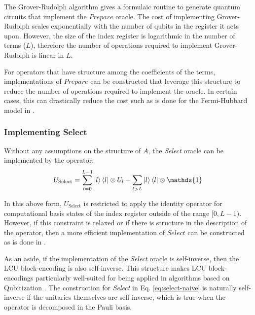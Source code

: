 The Grover-Rudolph algorithm \cite{grover2002creating} gives a formulaic routine to generate quantum circuits that implement the $\textit{Prepare}$ oracle.
The cost of implementing Grover-Rudolph scales exponentially with the number of qubits in the register it acts upon.
However, the size of the index register is logarithmic in the number of terms ($L$), therefore the number of operations required to implement Grover-Rudolph is linear in $L$.

For operators that have structure among the coefficients of the terms, implementations of $\textit{Prepare}$ can be constructed that leverage this structure to reduce the number of operations required to implement the oracle.
In certain cases, this can drastically reduce the cost such as is done for the Fermi-Hubbard model in \cite{babbush2018encoding}.

\subsubsection{Implementing \textbf{Select}}


Without any assumptions on the structure of $A$, the \textit{Select} oracle can be implemented by the operator:
\begin{equation}
    \label{eq:select-naive}
    U_\text{Select} = \sum_{l=0}^{L-1} \ket{l}\bra{l} \otimes U_l + \sum_{l>L} \ket{l}\bra{l} \otimes \mathds{1}
\end{equation}

In this above form, $U_\text{Select}$ is restricted to apply the identity operator for computational basis states of the index register outside of the range $[0, L-1)$.
However, if this constraint is relaxed or if there is structure in the description of the operator, then a more efficient implementation of $\textit{Select}$ can be constructed as is done in \cite{babbush2018encoding}.  

As an aside, if the implementation of the \textit{Select} oracle is self-inverse, then the LCU block-encoding is also self-inverse.
This structure makes LCU block-encodings particularly well-suited for being applied in algorithms based on Qubitization \cite{low2019hamiltonian}.
The construction for \textit{Select} in Eq. \ref{eq:select-naive} is naturally self-inverse if the unitaries themselves are self-inverse, which is true when the operator is decomposed in the Pauli basis.

